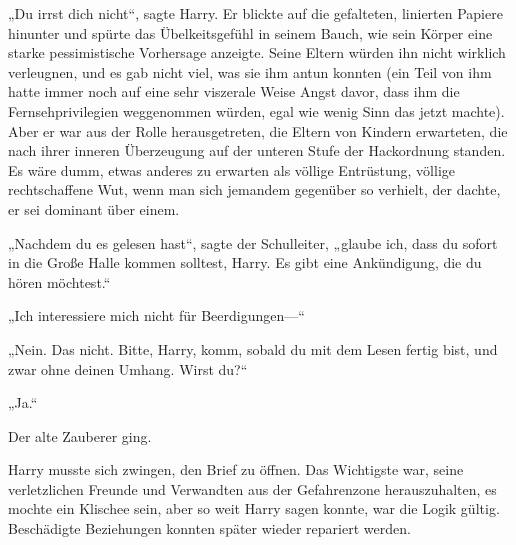 „Du irrst dich nicht“, sagte Harry. Er blickte auf die gefalteten, linierten Papiere hinunter und spürte das Übelkeitsgefühl in seinem Bauch, wie sein Körper eine starke pessimistische Vorhersage anzeigte. Seine Eltern würden ihn nicht wirklich verleugnen, und es gab nicht viel, was sie ihm antun konnten (ein Teil von ihm hatte immer noch auf eine sehr viszerale Weise Angst davor, dass ihm die Fernsehprivilegien weggenommen würden, egal wie wenig Sinn das jetzt machte). Aber er war aus der Rolle herausgetreten, die Eltern von Kindern erwarteten, die nach ihrer inneren Überzeugung auf der unteren Stufe der Hackordnung standen. Es wäre dumm, etwas anderes zu erwarten als völlige Entrüstung, völlige rechtschaffene Wut, wenn man sich jemandem gegenüber so verhielt, der dachte, er sei dominant über einem.

„Nachdem du es gelesen hast“, sagte der Schulleiter, „glaube ich, dass du sofort in die Große Halle kommen solltest, Harry. Es gibt eine Ankündigung, die du hören möchtest.“

„Ich interessiere mich nicht für Beerdigungen—“

„Nein. Das nicht. Bitte, Harry, komm, sobald du mit dem Lesen fertig bist, und zwar ohne deinen Umhang. Wirst du?“

„Ja.“

Der alte Zauberer ging.

Harry musste sich zwingen, den Brief zu öffnen. Das Wichtigste war, seine verletzlichen Freunde und Verwandten aus der Gefahrenzone herauszuhalten, es mochte ein Klischee sein, aber so weit Harry sagen konnte, war die Logik gültig. Beschädigte Beziehungen konnten später wieder repariert werden.

